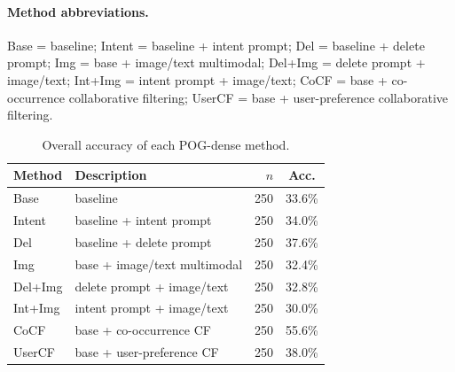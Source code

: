 






\paragraph{Method abbreviations.} Base = baseline; Intent = baseline + intent prompt; Del = baseline + delete prompt; Img = base + image/text multimodal; Del+Img = delete prompt + image/text; Int+Img = intent prompt + image/text; CoCF = base + co-occurrence collaborative filtering; UserCF = base + user-preference collaborative filtering.



\begin{table}[t]
\centering
\small
\caption{Overall accuracy of each POG-dense method.}
\label{tab:overall-method-acc}
\begin{tabular}{l l r c}
\toprule
Method & Description & $n$ & Acc. \\
\midrule
Base & baseline & 250 & 33.6\% \\
Intent & baseline + intent prompt & 250 & 34.0\% \\
Del & baseline + delete prompt & 250 & 37.6\% \\
Img & base + image/text multimodal & 250 & 32.4\% \\
Del+Img & delete prompt + image/text & 250 & 32.8\% \\
Int+Img & intent prompt + image/text & 250 & 30.0\% \\
CoCF & base + co-occurrence CF & 250 & 55.6\% \\
UserCF & base + user-preference CF & 250 & 38.0\% \\
\bottomrule
\end{tabular}
\end{table}



